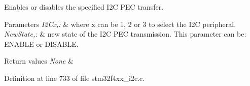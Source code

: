 Enables or disables the specified I2\-C P\-E\-C transfer. 


\begin{DoxyParams}{Parameters}
{\em I2\-Cx,\-:} & where x can be 1, 2 or 3 to select the I2\-C peripheral. \\
\hline
{\em New\-State,\-:} & new state of the I2\-C P\-E\-C transmission. This parameter can be\-: E\-N\-A\-B\-L\-E or D\-I\-S\-A\-B\-L\-E. \\
\hline
\end{DoxyParams}

\begin{DoxyRetVals}{Return values}
{\em None} & \\
\hline
\end{DoxyRetVals}


Definition at line 733 of file stm32f4xx\-\_\-i2c.\-c.

